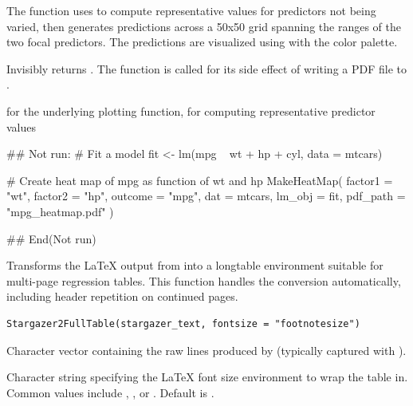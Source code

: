 \documentclass[a4paper]{book}
\begin{document}
%
\begin{Details}
The function uses  to compute representative values
for predictors not being varied, then generates predictions across a 50x50
grid spanning the ranges of the two focal predictors. The predictions are
visualized using  with the  color palette.
\end{Details}
%
\begin{Value}
Invisibly returns . The function is called for its side
effect of writing a PDF file to .
\end{Value}
%
\begin{SeeAlso}
 for the underlying plotting function,
 for computing representative predictor values
\end{SeeAlso}
%
\begin{Examples}
\begin{ExampleCode}
## Not run: 
# Fit a model
fit <- lm(mpg ~ wt + hp + cyl, data = mtcars)

# Create heat map of mpg as function of wt and hp
MakeHeatMap(
  factor1 = "wt",
  factor2 = "hp",
  outcome = "mpg",
  dat = mtcars,
  lm_obj = fit,
  pdf_path = "mpg_heatmap.pdf"
)

## End(Not run)

\end{ExampleCode}
\end{Examples}
%
\begin{Description}
Transforms the LaTeX output from  into a
longtable environment suitable for multi-page regression tables. This function
handles the conversion automatically, including header repetition on continued
pages.
\end{Description}
%
\begin{Usage}
\begin{verbatim}
Stargazer2FullTable(stargazer_text, fontsize = "footnotesize")
\end{verbatim}
\end{Usage}
%
\begin{Arguments}
\begin{ldescription}
\item[\code{stargazer\_text}] Character vector containing the raw lines produced by
 (typically captured with ).

\item[\code{fontsize}] Character string specifying the LaTeX font size environment
to wrap the table in. Common values include ,
, or . Default is .
\end{ldescription}
\end{Arguments}
\end{document}
